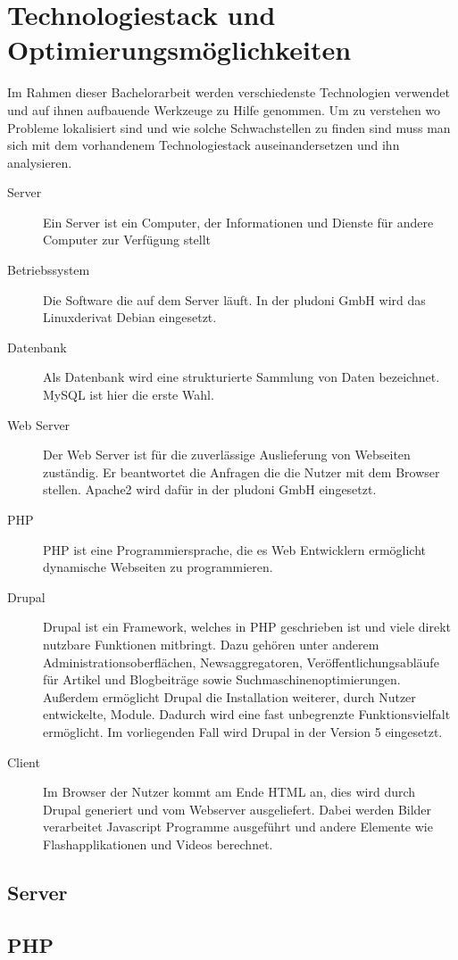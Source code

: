 \section{Technologiestack und Optimierungsmöglichkeiten}
Im Rahmen dieser Bachelorarbeit werden verschiedenste Technologien verwendet und auf ihnen aufbauende Werkzeuge zu Hilfe genommen. Um zu verstehen wo Probleme lokalisiert sind und wie solche Schwachstellen zu finden sind muss man sich mit dem vorhandenem Technologiestack auseinandersetzen und ihn analysieren.
\begin{description}
  \item[Server] Ein Server ist ein Computer, der Informationen und Dienste für andere Computer zur Verfügung stellt
  \item[Betriebssystem] Die Software die auf dem Server läuft. In der pludoni GmbH wird das Linuxderivat Debian eingesetzt.
  \item[Datenbank] Als Datenbank wird eine strukturierte Sammlung von Daten bezeichnet. MySQL ist hier die erste Wahl.
  \item[Web Server] Der Web Server ist für die zuverlässige Auslieferung von Webseiten zuständig. Er beantwortet die Anfragen die die Nutzer mit dem Browser stellen. Apache2 wird dafür in der pludoni GmbH eingesetzt.
  \item[PHP] PHP ist eine Programmiersprache, die es Web Entwicklern ermöglicht dynamische Webseiten zu programmieren.
  \item[Drupal] Drupal ist ein Framework, welches in PHP geschrieben ist und viele direkt nutzbare Funktionen mitbringt. Dazu gehören unter anderem Administrationsoberflächen, Newsaggregatoren, Veröffentlichungsabläufe für Artikel und Blogbeiträge sowie Suchmaschinenoptimierungen. Außerdem ermöglicht Drupal die Installation weiterer, durch Nutzer entwickelte, Module. Dadurch wird eine fast unbegrenzte Funktionsvielfalt ermöglicht. Im vorliegenden Fall wird Drupal in der Version 5 eingesetzt.
  \item[Client] Im Browser der Nutzer kommt am Ende HTML an, dies wird durch Drupal generiert und vom Webserver ausgeliefert. Dabei werden Bilder verarbeitet Javascript Programme ausgeführt und andere Elemente wie Flashapplikationen und Videos berechnet. 
\end{description}

\subsection{Server}
\subsection{PHP}
